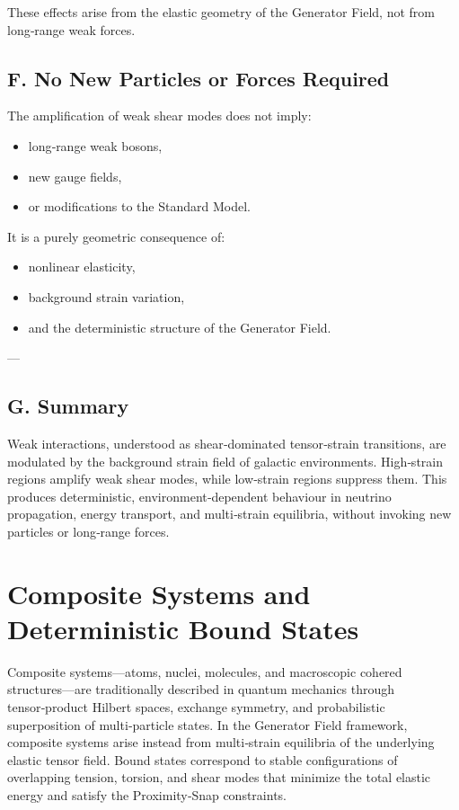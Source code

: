 \documentclass[reprint,amsmath,amssymb,aps,prl,floatfix]{revtex4-2}
\begin{document}
\begin{itemize}
These effects arise from the elastic geometry of the Generator Field, not from long‑range weak forces.

\subsection{F. No New Particles or Forces Required}

The amplification of weak shear modes does not imply:

\begin{itemize}
\item long‑range weak bosons,  
\item new gauge fields,  
\item or modifications to the Standard Model.
\end{itemize}

It is a purely geometric consequence of:

\begin{itemize}
\item nonlinear elasticity,  
\item background strain variation,  
\item and the deterministic structure of the Generator Field.
\end{itemize}

---

\subsection{G. Summary}

Weak interactions, understood as shear‑dominated tensor‑strain transitions, are modulated by the background strain field of galactic environments. High‑strain regions amplify weak shear modes, while low‑strain regions suppress them. This produces deterministic, environment‑dependent behaviour in neutrino propagation, energy transport, and multi‑strain equilibria, without invoking new particles or long‑range forces.

\section{Composite Systems and Deterministic Bound States}

Composite systems—atoms, nuclei, molecules, and macroscopic cohered structures—are traditionally described in quantum mechanics through tensor‑product Hilbert spaces, exchange symmetry, and probabilistic superposition of multi‑particle states. In the Generator Field framework, composite systems arise instead from multi‑strain equilibria of the underlying elastic tensor field. Bound states correspond to stable configurations of overlapping tension, torsion, and shear modes that minimize the total elastic energy and satisfy the Proximity‑Snap constraints.
\medskip


\end{itemize}
\end{document}
